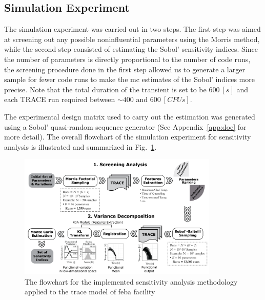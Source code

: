 \subsection{Simulation Experiment}\label{sub:sa_application_simulation_experiment}

The simulation experiment was carried out in two steps.
The first step was aimed at screening out any possible noninfluential parameters using the Morris method, 
while the second step consisted of estimating the Sobol' sensitivity indices.
Since the number of parameters is directly proportional to the number of code runs, 
the screening procedure done in the first step allowed us to generate a larger sample for fewer code runs to make the \gls{mc} estimates of the Sobol' indices more precise.
Note that the total duration of the transient is set to be $600 \ [s]$ and each TRACE run required between $\sim 400$ and $600 \ [CPUs]$.

The experimental design matrix used to carry out the estimation was generated using a Sobol' quasi-random sequence generator \cite{Joe2008} (See Appendix~\ref{app:doe} for more detail).
The overall flowchart of the simulation experiment for sensitivity analysis is illustrated and summarized in Fig.~\ref{fig:sensitivity_flowchart}.

\begin{figure}
	\centering
	\includegraphics[width=0.85\textwidth]{../figures/sensitivityFlowchart/sensitivityFlowchart.png}
	\caption[The flowchart for the implemented sensitivity analysis methodology applied to the TRACE model of FEBA facility]{The flowchart for the implemented sensitivity analysis methodology applied to the \gls{trace} model of \gls{feba} facility}
	\label{fig:sensitivity_flowchart}
\end{figure}


